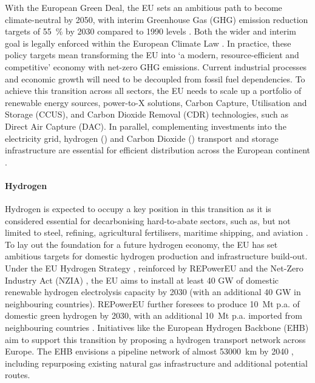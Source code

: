 \documentclass[preprint,12pt,sort&compress]{elsarticle}
\begin{document}
With the European Green Deal, the EU sets an ambitious path to become climate-neutral by 2050, with interim Greenhouse Gas (GHG) emission reduction targets of \SI{55}{\percent} by 2030 compared to 1990 levels \cite{europeancommissionFit55Delivering2021}. Both the wider and interim goal is legally enforced within the European Climate Law \cite{europeanparliamentRegulationEU20212021}. In practice, these policy targets mean transforming the EU into `a modern, resource-efficient and competitive' economy \cite{europeancommissionEuropeanGreenDeal2021} with net-zero GHG emissions. Current industrial processes and economic growth will need to be decoupled from fossil fuel dependencies. To achieve this transition across all sectors, the EU needs to scale up a portfolio of renewable energy sources, power-to-X solutions, Carbon Capture, Utilisation and Storage (CCUS), and Carbon Dioxide Removal (CDR) technologies, such as Direct Air Capture (DAC). In parallel, complementing investments into the electricity grid, hydrogen () and Carbon Dioxide () transport and storage infrastructure are essential for efficient distribution across the European continent \cite{hofmannH2CO2Network2025}.

\paragraph{Hydrogen}
Hydrogen is expected to occupy a key position in this transition as it is considered essential for decarbonising hard-to-abate sectors, such as, but not limited to steel, refining, agricultural fertilisers, maritime shipping, and aviation \cite{beresWillHydrogenSynthetic2024,neumannPotentialRoleHydrogen2023}. To lay out the foundation for a future hydrogen economy, the EU has set ambitious targets for domestic hydrogen production and infrastructure build-out. Under the EU Hydrogen Strategy \cite{europeancommissionCommunicationCommissionEuropean2020}, reinforced by REPowerEU \cite{europeancommissionREPowerEUPlanCommunication2022} and the Net-Zero Industry Act (NZIA) \cite{europeanparliamentRegulationEU20242024}, the EU aims to install at least 40 GW of domestic renewable hydrogen electrolysis capacity by 2030 (with an additional 40 GW in neighbouring countries). REPowerEU further foresees to produce \SI{10}{Mt} p.a. of domestic green hydrogen by 2030, with an additional \SI{10}{Mt} p.a. imported from neighbouring countries \cite{europeancommissionREPowerEUPlanCommunication2022}. Initiatives like the European Hydrogen Backbone (EHB) aim to support this transition by proposing a hydrogen transport network across Europe. The EHB envisions a  pipeline network of almost \SI{53000}{km} by 2040 \cite{europeanhydrogenbackboneinitiativeEuropeanHydrogenBackbone2022}, including repurposing existing natural gas infrastructure and additional potential routes.
\end{document}
